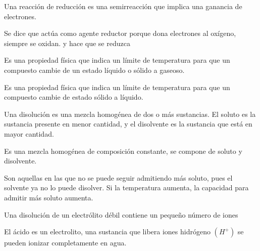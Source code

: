 \begin{definition}[Reducción]
	Una reacción de reducción es una semirreacción que implica una ganancia de electrones.
\end{definition}

\begin{definition}
	Se dice que actúa como agente reductor porque dona electrones al oxígeno, siempre se oxidan.
	y hace que se reduzca
\end{definition}


\begin{definition}
	Es una propiedad física que indica un límite de temperatura para que un compuesto cambie de un estado
	líquido o sólido a gaseoso.
\end{definition}

\begin{definition}
	Es una propiedad física que indica un límite de temperatura para que un compuesto cambie de
	estado sólido a líquido.
\end{definition}

\begin{definition}[Solución]
	Una disolución es una mezcla homogénea de dos o más sustancias. El soluto es la sustancia presente en menor cantidad, y el disolvente es la sustancia que está en mayor
	cantidad.
\end{definition}

\begin{definition}[Disolución]
	Es una mezcla homogénea de composición constante, se compone de soluto y disolvente.
\end{definition}

\begin{definition}
	Son aquellas en las que no se puede seguir admitiendo
	más soluto, pues el solvente ya no lo puede disolver.
	Si la temperatura aumenta, la capacidad para admitir
	más soluto aumenta.
\end{definition}

\begin{definition}
	Una disolución de un electrólito débil contiene un pequeño número de iones
\end{definition}


\begin{definition}[Ácido]
	El ácido es un electrolito, una sustancia que libera iones hidrógeno $(H^{+})$
	se pueden ionizar completamente en agua.
\end{definition}


